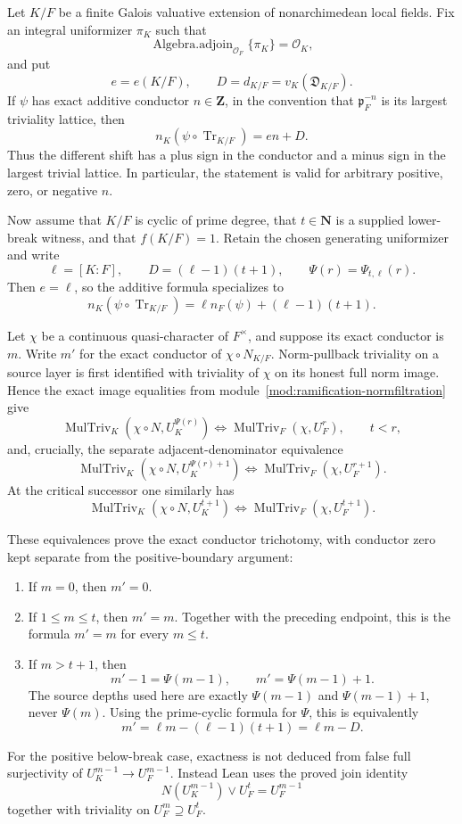 \begin{theorem}
\label{mod:ramification-pullbackconductors}
Let $K/F$ be a finite Galois valuative extension of nonarchimedean local
fields.  Fix an integral uniformizer $\pi_K$ such that
\[
 \operatorname{Algebra.adjoin}_{\mathcal O_F}\{\pi_K\}=\mathcal O_K,
\]
and put
\[
 e=e(K/F),\qquad D=d_{K/F}=v_K(\mathfrak D_{K/F}).
\]
If $\psi$ has exact additive conductor $n\in\mathbf Z$, in the convention
that $\mathfrak p_F^{-n}$ is its largest triviality lattice, then
\[
 \boxed{\quad
 n_K(\psi\circ\operatorname{Tr}_{K/F})=e n+D.
 \quad}
\]
Thus the different shift has a plus sign in the conductor and a minus sign
in the largest trivial lattice.  In particular, the statement is valid for
arbitrary positive, zero, or negative $n$.

Now assume that $K/F$ is cyclic of prime degree, that $t\in\mathbf N$ is a
supplied lower-break witness, and that $f(K/F)=1$.  Retain the chosen
generating uniformizer and write
\[
 \ell=[K:F],\qquad D=(\ell-1)(t+1),\qquad
 \Psi(r)=\Psi_{t,\ell}(r).
\]
Then $e=\ell$, so the additive formula specializes to
\[
 \boxed{\quad
 n_K(\psi\circ\operatorname{Tr}_{K/F})
 =\ell n_F(\psi)+(\ell-1)(t+1).
 \quad}
\]

Let $\chi$ be a continuous quasi-character of $F^\times$, and suppose its
exact conductor is $m$.  Write $m'$ for the exact conductor of
$\chi\circ N_{K/F}$.  Norm-pullback triviality on a source layer is first
identified with triviality of $\chi$ on its honest full norm image.  Hence
the exact image equalities from
module~\ref{mod:ramification-normfiltration} give
\[
 \operatorname{MulTriv}_K(\chi\circ N,U_K^{\Psi(r)})
 \Longleftrightarrow
 \operatorname{MulTriv}_F(\chi,U_F^r),
 \qquad t<r,
\]
and, crucially, the separate adjacent-denominator equivalence
\[
 \operatorname{MulTriv}_K(\chi\circ N,U_K^{\Psi(r)+1})
 \Longleftrightarrow
 \operatorname{MulTriv}_F(\chi,U_F^{r+1}).
\]
At the critical successor one similarly has
\[
 \operatorname{MulTriv}_K(\chi\circ N,U_K^{t+1})
 \Longleftrightarrow
 \operatorname{MulTriv}_F(\chi,U_F^{t+1}).
\]

These equivalences prove the exact conductor trichotomy, with conductor zero
kept separate from the positive-boundary argument:
\begin{enumerate}[label=(\roman*)]
\item If $m=0$, then $m'=0$.
\item If $1\le m\le t$, then $m'=m$.  Together with the preceding endpoint,
this is the formula $m'=m$ for every $m\le t$.
\item If $m>t+1$, then
\[
 \boxed{\quad m'-1=\Psi(m-1),\qquad
 m'=\Psi(m-1)+1.\quad}
\]
The source depths used here are exactly $\Psi(m-1)$ and
$\Psi(m-1)+1$, never $\Psi(m)$.  Using the prime-cyclic formula for $\Psi$,
this is equivalently
\[
 \boxed{\quad
 m'=\ell m-(\ell-1)(t+1)=\ell m-D.
 \quad}
\]
\end{enumerate}
For the positive below-break case, exactness is not deduced from false full
surjectivity of $U_K^{m-1}\to U_F^{m-1}$.  Instead Lean uses the proved join
identity
\[
 N(U_K^{m-1})\vee U_F^t=U_F^{m-1}
\]
together with triviality on $U_F^m\supseteq U_F^t$.


\end{theorem}
